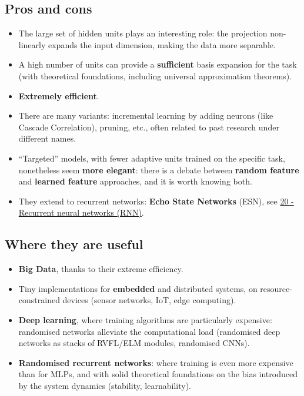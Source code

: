 \subsection{Pros and cons}\label{pro-e-contro}

\begin{itemize}
\tightlist
\item
  The large set of hidden units plays an interesting role: the
  projection non-linearly expands the input dimension, making the data
  more separable.
\item
  A high number of units can provide a \textbf{sufficient} basis
  expansion for the task (with theoretical foundations, including
  universal approximation theorems).
\item
  \textbf{Extremely efficient}.
\item
  There are many variants: incremental learning by adding neurons (like
  Cascade Correlation), pruning, etc., often related to past research
  under different names.
\item
  ``Targeted'' models, with fewer adaptive units trained on the
  specific task, nonetheless seem \textbf{more elegant}: there is a
  debate between \textbf{random feature} and \textbf{learned feature}
  approaches, and it is worth knowing both.
\item
  They extend to recurrent networks: \textbf{Echo State Networks}
  (ESN), see
  \href{20\%20-\%20Reti\%20neurali\%20ricorrenti\%20(RNN)}{20 -
  Recurrent neural networks (RNN)}.
\end{itemize}

\subsection{Where they are useful}\label{dove-sono-utili}

\begin{itemize}
\tightlist
\item
  \textbf{Big Data}, thanks to their extreme efficiency.
\item
  Tiny implementations for \textbf{embedded} and distributed systems,
  on resource-constrained devices (sensor networks, IoT, edge
  computing).
\item
  \textbf{Deep learning}, where training algorithms are particularly
  expensive: randomised networks alleviate the computational load
  (randomised deep networks as stacks of RVFL/ELM modules, randomised
  CNNs).
\item
  \textbf{Randomised recurrent networks}: where training is even more
  expensive than for MLPs, and with solid theoretical foundations on
  the bias introduced by the system dynamics (stability,
  learnability).
\end{itemize}

